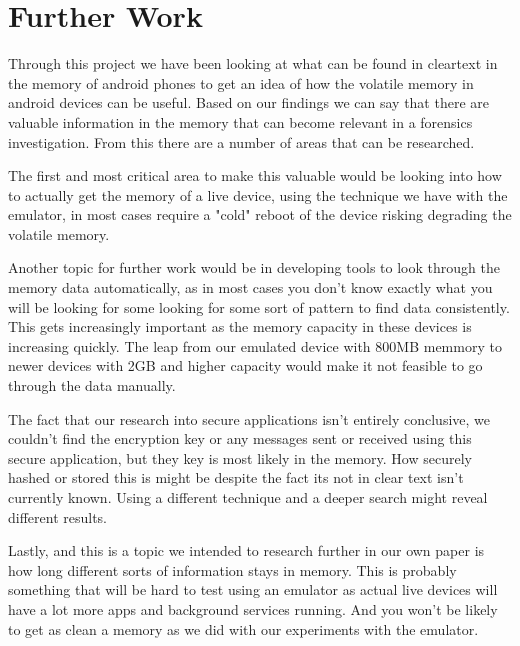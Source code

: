 \section{Further Work}
Through this project we have been looking at what can be found in cleartext in 
the memory of android phones to get an idea of how the volatile memory in 
android devices  can be useful. Based on our findings we can say that there are
valuable information in the memory that can become relevant in a forensics investigation. 
From this there are a number of areas that can be researched.

The first and most critical area to make this valuable would be looking into how 
to actually get the memory of a live device, using the technique we have with 
the emulator, in most cases require a "cold" reboot of the device risking degrading 
the volatile memory.

Another topic for further work would be in developing tools to look through the 
memory data automatically, as in most cases you don't know exactly what you will 
be looking for some looking for some sort of pattern to find data consistently. 
This gets increasingly important as the memory capacity in these devices is increasing 
quickly. The leap from our emulated device with 800MB memmory to newer devices 
with 2GB and higher capacity would make it not feasible to go through the data manually.

The fact that our research into secure applications isn't entirely conclusive, we
couldn't find the encryption  key or any messages sent or received using this 
secure application, but they key is most likely in the memory. How 
securely hashed or stored this is might be despite the fact its not in clear text 
isn't currently known. Using a different technique and a deeper search might 
reveal different results.

Lastly, and this is a topic we intended to research further in our own paper is 
how long different sorts of information stays in memory. This is probably 
something that will be hard to test using an emulator as actual live devices will 
have a lot more apps and background services running. And you won't be likely to 
get as clean a memory as we did with our experiments with the emulator. 

